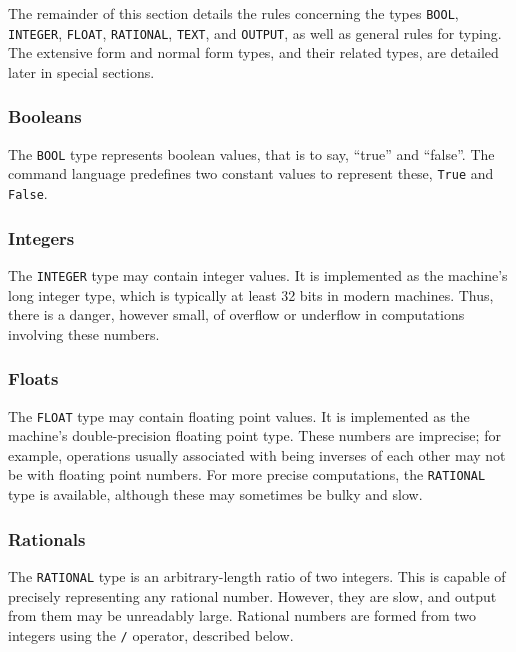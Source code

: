 \medskip

The remainder of this section details the rules concerning the types
{\tt BOOL}, {\tt INTEGER}, {\tt FLOAT}, {\tt RATIONAL}, {\tt TEXT}, and
{\tt OUTPUT}, as well as general rules for typing.  The extensive form
and normal form types, and their related types, are detailed later in
special sections.

\subsubsection{Booleans}

The {\tt BOOL} type represents boolean values, that is to say, ``true'' and
``false''.  The command language predefines two constant values to
represent these, {\tt True} and {\tt False}.

\subsubsection{Integers}

The {\tt INTEGER} type may contain integer values.  It is implemented
as the machine's long integer type, which is typically at least 32
bits in modern machines.  Thus, there is a danger, however small, of
overflow or underflow in computations involving these numbers.

\subsubsection{Floats}

The {\tt FLOAT} type may contain floating point values.  It is implemented
as the machine's double-precision floating point type.  These numbers
are imprecise; for example, operations usually associated with being inverses
of each other may not be with floating point numbers.  For more precise
computations, the {\tt RATIONAL} type is available, although these may
sometimes be bulky and slow.

\subsubsection{Rationals}

The {\tt RATIONAL} type is an arbitrary-length ratio of two integers.
This is capable of precisely representing any rational number.  However,
they are slow, and output from them may be unreadably large.  Rational
numbers are formed from two integers using the {\tt /} operator, 
described below.

